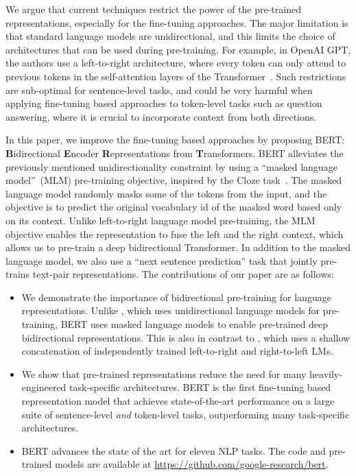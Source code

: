 \documentclass[11pt,a4paper]{article}
\newcommand\bert{BERT\xspace}
\begin{document}
We argue that current techniques restrict the power of the pre-trained representations, especially for the fine-tuning approaches. The major limitation is that standard language models are unidirectional, and this limits the choice of architectures that can be used during pre-training. For example, in OpenAI GPT, the authors use a left-to-right architecture, where every token can only attend to previous tokens in the self-attention layers of the Transformer~\cite{vaswani-etal:2017:_atten}. Such restrictions are sub-optimal for sentence-level tasks, and could be very harmful when applying fine-tuning based approaches to token-level tasks such as  question answering, where it is crucial to incorporate context from both directions.

In this paper, we improve the fine-tuning based approaches by proposing \bert: \textbf{B}idirectional \textbf{E}ncoder \textbf{R}epresentations from \textbf{T}ransformers. \bert alleviates the previously mentioned unidirectionality constraint by using a ``masked language model''~(MLM) pre-training objective, inspired by the Cloze task~\cite{taylor:1953:_cloze}. The masked language model randomly masks some of the tokens from the input, and the objective is to predict the original vocabulary id of the masked word based only on its context. Unlike left-to-right language model pre-training, the MLM objective enables the representation to fuse the left and the right context, which allows us to pre-train a deep bidirectional Transformer. In addition to the masked language model, we also use a ``next sentence prediction'' task that jointly pre-trains text-pair representations. The contributions of our paper are as follows:
\begin{itemize}[leftmargin=1em]
  \item We demonstrate the importance of bidirectional pre-training for language representations. Unlike \citet{radford-etal:2018}, which uses unidirectional language models for pre-training, \bert uses masked language models to enable pre-trained deep bidirectional representations. This is also in contrast to \citet{peters-etal:2018:_deep}, which uses a shallow concatenation of independently trained left-to-right and right-to-left LMs.
  \item We show that pre-trained representations reduce the need for many heavily-engineered task-specific architectures. \bert is the first fine-tuning based representation model that achieves state-of-the-art performance on a large suite of sentence-level {\em and} token-level tasks, outperforming many task-specific architectures.
  \item \bert advances the state of the art for eleven NLP tasks. 
%
    The code and pre-trained models are available at \url{https://github.com/google-research/bert}.
\end{itemize}
\end{document}
